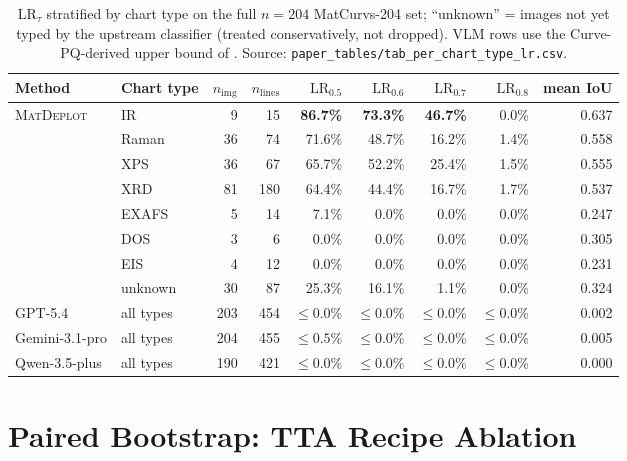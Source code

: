 \documentclass{article}
\begin{document}
\begin{table}[h]
\centering
\caption{$\mathrm{LR}_\tau$ stratified by chart type on the full
$n{=}204$ MatCurvs-204 set; ``unknown'' = images not yet typed by
the upstream classifier (treated conservatively, not dropped). VLM
rows use the Curve-PQ-derived upper bound of .
Source: \texttt{paper\_tables/tab\_per\_chart\_type\_lr.csv}.}
\label{tab:per-chart-type-lr}
\small
\setlength{\tabcolsep}{4pt}
\begin{tabular}{llrrrrrrr}
\toprule
Method & Chart type & $n_{\mathrm{img}}$ & $n_{\mathrm{lines}}$ &
$\mathrm{LR}_{0.5}$ & $\mathrm{LR}_{0.6}$ &
$\mathrm{LR}_{0.7}$ & $\mathrm{LR}_{0.8}$ & mean IoU \\
\midrule
\multirow{8}{*}{\textsc{MatDeplot}}
& IR        & 9   & 15  & \textbf{86.7\%} & \textbf{73.3\%} & \textbf{46.7\%} & 0.0\%  & 0.637 \\
& Raman     & 36  & 74  & 71.6\%          & 48.7\%          & 16.2\%          & 1.4\%  & 0.558 \\
& XPS       & 36  & 67  & 65.7\%          & 52.2\%          & 25.4\%          & 1.5\%  & 0.555 \\
& XRD       & 81  & 180 & 64.4\%          & 44.4\%          & 16.7\%          & 1.7\%  & 0.537 \\
& EXAFS     & 5   & 14  & 7.1\%           & 0.0\%           & 0.0\%           & 0.0\%  & 0.247 \\
& DOS       & 3   & 6   & 0.0\%           & 0.0\%           & 0.0\%           & 0.0\%  & 0.305 \\
& EIS       & 4   & 12  & 0.0\%           & 0.0\%           & 0.0\%           & 0.0\%  & 0.231 \\
& unknown   & 30  & 87  & 25.3\%          & 16.1\%          & 1.1\%           & 0.0\%  & 0.324 \\
\midrule
GPT-5.4         & all types & 203 & 454 & $\leq 0.0$\% & $\leq 0.0$\% & $\leq 0.0$\% & $\leq 0.0$\% & 0.002 \\
Gemini-3.1-pro  & all types & 204 & 455 & $\leq 0.5$\% & $\leq 0.0$\% & $\leq 0.0$\% & $\leq 0.0$\% & 0.005 \\
Qwen-3.5-plus   & all types & 190 & 421 & $\leq 0.0$\% & $\leq 0.0$\% & $\leq 0.0$\% & $\leq 0.0$\% & 0.000 \\
\bottomrule
\end{tabular}
\end{table}

\section{Paired Bootstrap: TTA Recipe Ablation}
\label{app:bootstrap-ci}
\setcounter{table}{0}\setcounter{figure}{0}
\end{document}
